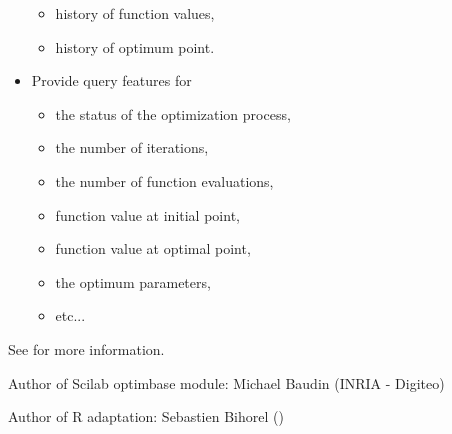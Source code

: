 \begin{Description}
\begin{itemize}
\begin{itemize}
\item history of function values,
\item history of optimum point.

\end{itemize}

\item Provide query features for \begin{itemize}

\item the status of the optimization process,
\item the number of iterations,
\item the number of function evaluations,
\item function value at initial point,
\item function value at optimal point,
\item the optimum parameters,
\item etc...

\end{itemize}


\end{itemize}

\end{Description}
%
\begin{Details}\relax

See  for more information.
\end{Details}
%
\begin{Author}\relax
Author of Scilab optimbase module: Michael Baudin (INRIA - Digiteo)

Author of R adaptation: Sebastien Bihorel ()
\end{Author}
